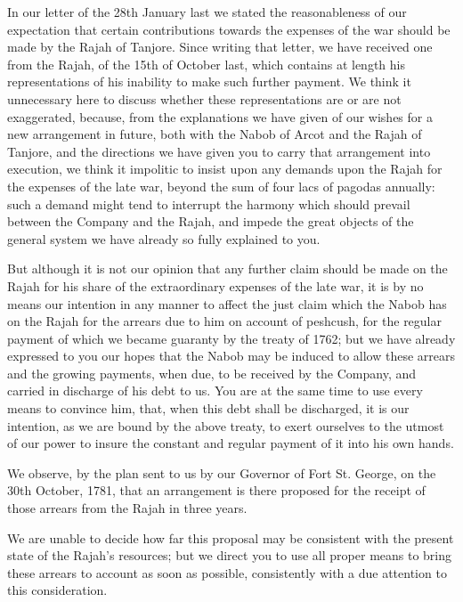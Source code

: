 


In our letter of the 28th January last we stated the reasonableness of our expectation that certain contributions towards the expenses of the war should be made by the Rajah of Tanjore. Since writing that letter, we have received one from the Rajah, of the 15th of October last, which contains at length his representations of his inability to make such further payment. We think it unnecessary here to discuss whether these representations are or are not exaggerated, because, from the explanations we have given of our wishes for a new arrangement in future, both with the Nabob of Arcot and the Rajah of Tanjore, and the directions we have given you to carry that arrangement into execution, we think it impolitic to insist upon any demands upon the Rajah for the expenses of the late war, beyond the sum of four lacs of pagodas annually: such a demand might tend to interrupt the harmony which should prevail between the Company and the Rajah, and impede the great objects of the general system we have already so fully explained to you.

But although it is not our opinion that any further claim should be made on the Rajah for his share of the extraordinary expenses of the late war, it is by no means our intention in any manner to affect the just claim which the Nabob has on the Rajah for the arrears due to him on account of peshcush, for the regular payment of which we became guaranty by the treaty of 1762; but we have already expressed to you our hopes that the Nabob may be induced to allow these arrears and the growing payments, when due, to be received by the Company, and carried in discharge of his debt to us. You are at the same time to use every means to convince him, that, when this debt shall be discharged, it is our intention, as we are bound by the above treaty, to exert ourselves to the utmost of our power to insure the constant and regular payment of it into his own hands.

We observe, by the plan sent to us by our Governor of Fort St. George, on the 30th October, 1781, that an arrangement is there proposed for the receipt of those arrears from the Rajah in three years.

We are unable to decide how far this proposal may be consistent with the present state of the Rajah's resources; but we direct you to use all proper means to bring these arrears to account as soon as possible, consistently with a due attention to this consideration.

